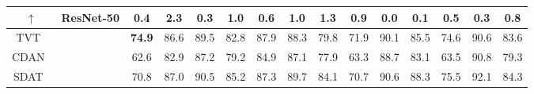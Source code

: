 \documentclass{article} \usepackage{iclr2023_conference,times}
\begin{document}
\begin{table}[t]
{\begin{tabular}{c|c|cccccccccccc|c}
$\uparrow$       &   \multirow{-8}{*}{{\color{brown} ResNet-50}}    & 0.4  & 2.3  & 0.3  & 1.0  & 0.6  & 1.0  & 1.3  & 0.9  & 0.0  & 0.1  & 0.5  & 0.3  & 0.8                                                                                                            \\\midrule
TVT~\citep{yang2021tvt}             &                             & \textbf{74.9}                                                         & 86.6                                                         & 89.5                                                         & 82.8                                                & 87.9                                                         & 88.3                                                & 79.8                                                & 71.9                                                         & 90.1                                                         & 85.5                                                & 74.6                                                         & 90.6                                                         & 83.6                                                         \\
CDAN~\citep{long2018conditional}            &                             & 62.6                                                         & 82.9                                                         & 87.2                                                         & 79.2                                                & 84.9                                                         & 87.1                                                & 77.9                                                & 63.3                                                         & 88.7                                                         & 83.1                                                & 63.5                                                         & 90.8                                                         & 79.3                                                         \\
SDAT~\citep{rangwani2022closer}            &                             & 70.8                                                         & 87.0                                                         & 90.5                                                         & 85.2                                                & 87.3                                                         & 89.7                                                & 84.1                                                & 70.7                                                         & 90.6                                                         & 88.3                                                & 75.5                                                         & 92.1                                                         & 84.3                                                         \\

\end{tabular}}
\end{table}
\end{document}
